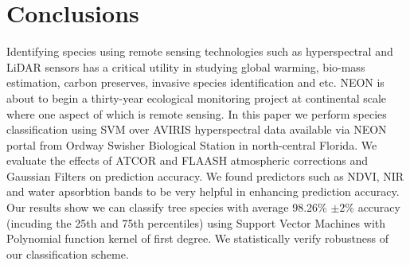 \documentclass[remotesensing,article,accept,moreauthors,pdftex,12pt,a4paper]{mdpi}
\begin{document}




\section{Conclusions}

Identifying species using remote sensing technologies such as hyperspectral and LiDAR sensors has a critical utility in studying global warming, bio-mass estimation, carbon preserves, invasive species identification and etc. 
NEON is about to begin a thirty-year ecological monitoring project at continental scale where one aspect of which is remote sensing. 
In this paper we perform species classification using SVM over AVIRIS hyperspectral data available via NEON portal from Ordway Swisher Biological Station in north-central Florida.
 We evaluate the effects of ATCOR and FLAASH atmospheric corrections and Gaussian Filters on prediction accuracy. 
 We found predictors such as NDVI, NIR and water apsorbtion bands to be very helpful in enhancing prediction accuracy. 
 Our results show we can classify tree species with average 98.26\% $\pm 2\%$ accuracy (incuding the 25th and 75th percentiles) using Support Vector Machines with Polynomial function kernel of first degree. We statistically verify robustness of our classification scheme.











\end{document}
